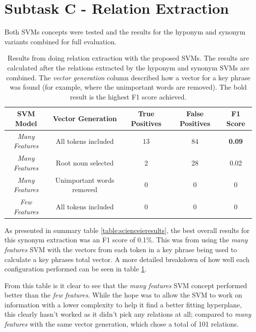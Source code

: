 \section{Subtask C - Relation Extraction}

Both SVMs concepts were tested and the results for the hyponym and synonym variants combined for full evaluation.

\begin{table}
	\centering
	\begin{tabular}{ c | c | c | c | c }
		\textbf{SVM Model} & \textbf{Vector Generation} & \textbf{True Positives} & \textbf{False Positives} & \textbf{F1 Score} \\
		\hline
		\textit{Many Features} & All tokens included & 13 & 84 & \textbf{0.09} \\
		\textit{Many Features} & Root noun selected & 2 & 28 & 0.02 \\
		\textit{Many Features} & Unimportant words removed & 0 & 0 & 0 \\
		\textit{Few Features} & All tokens included & 0 & 0 & 0 \\
	\end{tabular}
	\caption[Relation Extraction Specific Results]{Results from doing relation extraction with the proposed SVMs. The results are calculated after the relations extracted by the hyponym and synonym SVMs are combined. The \textit{vector generation} column described how a vector for a key phrase was found (for example, where the unimportant words are removed). The bold result is the highest F1 score achieved.}
	\label{table:relresults}
\end{table}

As presented in summary table \ref{table:scienceieresults}, the best overall results for this synonym extraction was an F1 score of 0.1\%. This was from using the \textit{many features} SVM with the vectors from each token in a key phrase being used to calculate a key phrases total vector. A more detailed breakdown of how well each configuration performed can be seen in table \ref{table:relresults}. 

From this table is it clear to see that the \textit{many features} SVM concept performed better than the \textit{few features}. While the hope was to allow the SVM to work on information with a lower complexity to help it find a better fitting hyperplane, this clearly hasn't worked as it didn't pick any relations at all; compared to \textit{many features} with the same vector generation, which chose a total of 101 relations. 

